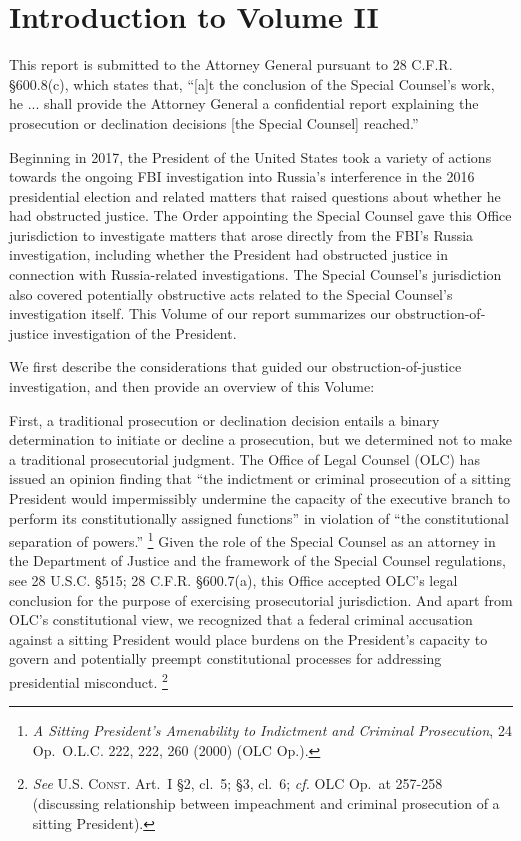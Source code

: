 \section*{Introduction to Volume II}
\label{sec:introduction-2}

This report is submitted to the Attorney General pursuant to 28 C.F.R. \S 600.8(c), which states that, “[a]t the conclusion of the Special Counsel’s work, he ... shall provide the Attorney General a confidential report explaining the prosecution or declination decisions [the Special Counsel] reached.”

Beginning in 2017, the President of the United States took a variety of actions towards the ongoing FBI investigation into Russia’s interference in the 2016 presidential election and related matters that raised questions about whether he had obstructed justice.
The Order appointing the Special Counsel gave this Office jurisdiction to investigate matters that arose directly from the FBI’s Russia investigation, including whether the President had obstructed justice in connection with Russia-related investigations.
The Special Counsel’s jurisdiction also covered potentially obstructive acts related to the Special Counsel’s investigation itself.
This Volume of our report summarizes our obstruction-of-justice investigation of the President.

We first describe the considerations that guided our obstruction-of-justice investigation, and then provide an overview of this Volume:

First, a traditional prosecution or declination decision entails a binary determination to initiate or decline a prosecution, but we determined not to make a traditional prosecutorial judgment.
The Office of Legal Counsel (OLC) has issued an opinion finding that “the indictment or criminal prosecution of a sitting President would impermissibly undermine the capacity of the executive branch to perform its constitutionally assigned functions” in violation of “the constitutional separation of powers.”%
\footnote{\textit{A Sitting President’s Amenability to Indictment and Criminal Prosecution}, 24 Op.\ O.L.C. 222, 222, 260 (2000) (OLC Op.).}
Given the role of the Special Counsel as an attorney in the Department of Justice and the framework of the Special Counsel regulations, see 28 U.S.C. \S 515; 28 C.F.R. \S 600.7(a), this Office accepted OLC’s legal conclusion for the purpose of exercising prosecutorial jurisdiction.
And apart from OLC’s constitutional view, we recognized that a federal criminal accusation against a sitting President would place burdens on the President’s capacity to govern and potentially preempt constitutional processes for addressing presidential misconduct.%
\footnote{\textit{See} \textsc{U.S. Const.} Art.~I \S 2, cl.~5; \S 3, cl.~6; \textit{cf.} OLC Op.\ at 257-258 (discussing relationship between impeachment and criminal prosecution of a sitting President).}

